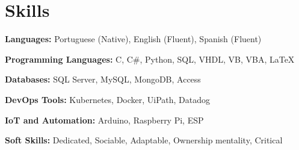 \section{Skills}
	\textbf{Languages:} Portuguese (Native), English (Fluent), Spanish (Fluent)

	\textbf{Programming Languages:} C, C\#, Python, SQL, VHDL, VB, VBA, LaTeX

	\textbf{Databases:} SQL Server, MySQL, MongoDB, Access

	\textbf{DevOps Tools:} Kubernetes, Docker, UiPath, Datadog

	\textbf{IoT and Automation:} Arduino, Raspberry Pi, ESP
	
	\textbf{Soft Skills:} Dedicated, Sociable, Adaptable, Ownership mentality, Critical